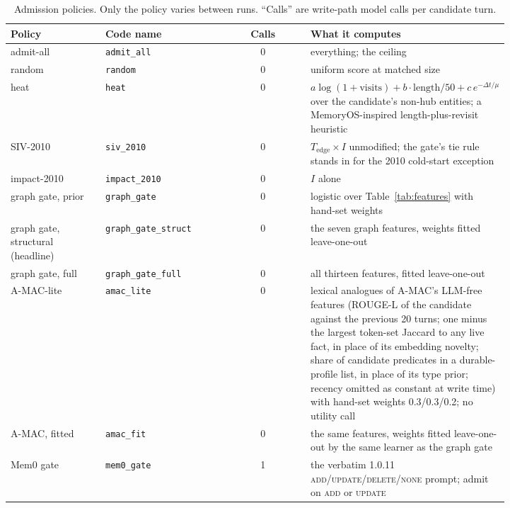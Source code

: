 \documentclass{ceurart}
\newcommand{\Tedge}{T_{\mathrm{edge}}}
\newcommand{\Imp}{I}
\newcommand{\code}[1]{\texttt{#1}}
\begin{document}
\begin{table}[tp]
  \centering
  \caption{Admission policies. Only the policy varies between runs. ``Calls'' are write-path model calls per candidate turn.}
  \label{tab:policies}
  \footnotesize
  \begin{tabular}{@{}p{0.19\linewidth}p{0.245\linewidth}cp{0.385\linewidth}@{}}
    \toprule
    Policy & Code name & Calls & What it computes \\
    \midrule
    admit-all & \code{admit\_all} & 0 & everything; the ceiling \\
    random & \code{random} & 0 & uniform score at matched size \\
    heat & \code{heat} & 0 & $a\log(1+\text{visits})+b\cdot\text{length}/50+c\,e^{-\Delta t/\mu}$ over the candidate's non-hub entities; a MemoryOS-inspired length-plus-revisit heuristic \\
    SIV-2010 & \code{siv\_2010} & 0 & $\Tedge\times\Imp$ unmodified; the gate's tie rule stands in for the 2010 cold-start exception \\
    impact-2010 & \code{impact\_2010} & 0 & $\Imp$ alone \\
    graph gate, prior & \code{graph\_gate} & 0 & logistic over Table~\ref{tab:features} with hand-set weights \\
    graph gate, structural (headline) & \code{graph\_gate\_struct} & 0 & the seven graph features, weights fitted leave-one-out \\
    graph gate, full & \code{graph\_gate\_full} & 0 & all thirteen features, fitted leave-one-out \\
    A-MAC-lite & \code{amac\_lite} & 0 & lexical analogues of A-MAC's LLM-free features (ROUGE-L of the candidate against the previous 20 turns; one minus the largest token-set Jaccard to any live fact, in place of its embedding novelty; share of candidate predicates in a durable-profile list, in place of its type prior; recency omitted as constant at write time) with hand-set weights 0.3/0.3/0.2; no utility call \\
    A-MAC, fitted & \code{amac\_fit} & 0 & the same features, weights fitted leave-one-out by the same learner as the graph gate \\
    Mem0 gate & \code{mem0\_gate} & 1 & the verbatim 1.0.11 \textsc{add}/\textsc{update}/\textsc{delete}/\textsc{none} prompt; admit on \textsc{add} or \textsc{update} \\
    \bottomrule
  \end{tabular}
\end{table}
\end{document}
